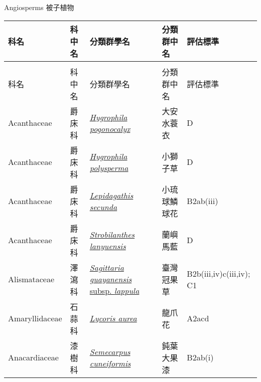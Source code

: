 \noindent\normalfont\selectfont Angiosperms 被子植物
\footnotesize\selectfont
        {\def\arraystretch{1.5}\tabcolsep=2pt
        \begin{longtable}{p{2.5cm}p{2.5cm}p{4.5cm}p{2.5cm}p{3cm}}
        \toprule
          科名 & 科中名 & 分類群學名 & 分類群中名 & 評估標準 \\
        \midrule 
        \endfirsthead

        \multicolumn{4}{l}{\bfseries\Large\color{red}{國家瀕危 (NEN) 類別維管束植物名錄(續)}} \\
        \toprule
        科名 & 科中名 & 分類群學名 & 分類群中名 & 評估標準 \\
        \midrule
        \endhead
                Acanthaceae & 爵床科 & \href{http://www.theplantlist.org/tpl1.1/search?q=Hygrophila+pogonocalyx}{\textit{Hygrophila pogonocalyx} } & 大安水蓑衣 & D \index{Hygrophila@\textit{Hygrophila}!pogonocalyx@\textit{pogonocalyx}}  \index{大安水蓑衣} \\
    Acanthaceae & 爵床科 & \href{http://www.theplantlist.org/tpl1.1/search?q=Hygrophila+polysperma}{\textit{Hygrophila polysperma} } & 小獅子草 & D \index{Hygrophila@\textit{Hygrophila}!polysperma@\textit{polysperma}}  \index{小獅子草} \\
    Acanthaceae & 爵床科 & \href{http://www.theplantlist.org/tpl1.1/search?q=Lepidagathis+secunda}{\textit{Lepidagathis secunda} } & 小琉球鱗球花 & B2ab(iii) \index{Lepidagathis@\textit{Lepidagathis}!secunda@\textit{secunda}}  \index{小琉球鱗球花} \\
    Acanthaceae & 爵床科 & \href{http://www.theplantlist.org/tpl1.1/search?q=Strobilanthes+lanyuensis}{\textit{Strobilanthes lanyuensis} } & 蘭嶼馬藍 & D \index{Strobilanthes@\textit{Strobilanthes}!lanyuensis@\textit{lanyuensis}}  \index{蘭嶼馬藍} \\
    Alismataceae & 澤瀉科 & \href{http://www.theplantlist.org/tpl1.1/search?q=Sagittaria+guayanensis+subsp.+lappula}{\textit{Sagittaria guayanensis} subsp. \textit{lappula} } & 臺灣冠果草 & B2b(iii,iv)c(iii,iv); C1 \index{Sagittaria@\textit{Sagittaria}!guayanensis@\textit{guayanensis}!subsp. lappula@subsp. \textit{lappula}}  \index{臺灣冠果草} \\
    Amaryllidaceae & 石蒜科 & \href{http://www.theplantlist.org/tpl1.1/search?q=Lycoris+aurea}{\textit{Lycoris aurea} } & 龍爪花 & A2acd \index{Lycoris@\textit{Lycoris}!aurea@\textit{aurea}}  \index{龍爪花} \\
    Anacardiaceae & 漆樹科 & \href{http://www.theplantlist.org/tpl1.1/search?q=Semecarpus+cuneiformis}{\textit{Semecarpus cuneiformis} } & 鈍葉大果漆 & B2ab(i) \index{Semecarpus@\textit{Semecarpus}!cuneiformis@\textit{cuneiformis}}  \index{鈍葉大果漆} \\

\end{longtable}}
